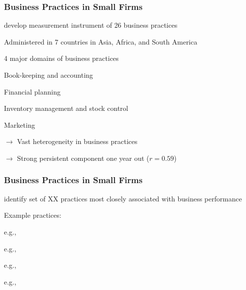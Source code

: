 \documentclass[hideothersubsections, usenames,dvipsnames,11pt]{beamer}
\newenvironment{itemize_2pt}{\itemize\addtolength{\itemsep}{2pt}}{\enditemize}
\newenvironment{enumerate_2pt}{\enumerate\addtolength{\itemsep}{2pt}}{\endenumerate}
\begin{document}
\begin{frame}
\frametitle{Business Practices in Small Firms}

	\citet{McKenzie2017} develop measurement instrument of \textcolor{bdf}{26 business practices} 
	\begin{itemize_2pt}
		\item Administered in \textcolor{bdf}{7 countries} in Asia, Africa, and South America
		
\vspace{0.5em}		
		
		\item 4 major domains of business practices
		\begin{enumerate_2pt}
			\item Book-keeping and accounting
			\item Financial planning
			\item Inventory management and stock control
			\item Marketing
		\end{enumerate_2pt}
	\item[] $\rightarrow$ \textcolor{bdf}{Vast heterogeneity} in business practices \citep[comp.][]{Bloom2010}
	\item[] $\rightarrow$ \textcolor{bdf}{Strong persistent component} one year out ($r=0.59$)
	\end{itemize_2pt}
\end{frame}


\begin{frame}
\frametitle{Business Practices in Small Firms}
	\citet{McKenzie2017} identify set of XX practices most closely associated with business performance
	\begin{itemize_2pt}
		\item Example practices:
		\begin{enumerate_2pt}
			\item e.g., 
			\item e.g., 
			\item e.g., 
			\item e.g.,  
		\end{enumerate_2pt}
	\end{itemize_2pt}
\end{frame}
\end{document}
